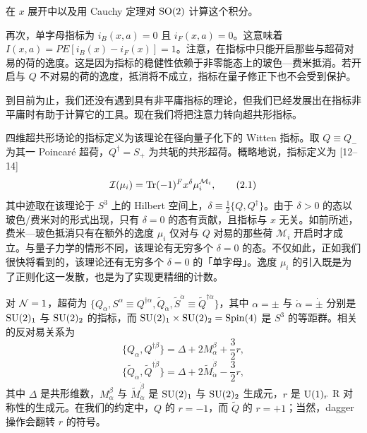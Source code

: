 \begin{exercise}[1.2]
在 $x$ 展开中以及用 Cauchy 定理对 $\operatorname{SO}(2)$ 计算这个积分。
\end{exercise}

再次，单字母指标为 $i_B(x,a)=0$ 且 $i_F(x,a)=0$。这意味着 $I(x,a)=PE[i_B(x)-i_F(x)]=1$。注意，在指标中只能开启那些与超荷对易的荷的逸度。这是因为指标的稳健性依赖于非零能态上的玻色—费米抵消。若开启与 $Q$ 不对易的荷的逸度，抵消将不成立，指标在量子修正下也不会受到保护。

到目前为止，我们还没有遇到具有非平庸指标的理论，但我们已经发展出在指标非平庸时有助于计算它的工具。现在我们将把注意力转向超共形指标。

四维超共形场论的指标定义为该理论在径向量子化下的 Witten 指标。取 $Q\equiv Q_-$ 为其一 Poincaré 超荷，$Q^\dagger=S_+$ 为共轭的共形超荷。概略地说，指标定义为 [12–14]
\[
\mathcal{I}(\mu_i)=\operatorname{Tr}(-1)^F x^{\delta}\mu_i^{\mathcal{M}_i} ,
\tag{2.1}
\]
其中迹取在该理论于 $S^3$ 上的 Hilbert 空间上，$\delta\equiv\frac12\{Q,Q^\dagger\}$。由于 $\delta>0$ 的态以玻色/费米对的形式出现，只有 $\delta=0$ 的态有贡献，且指标与 $x$ 无关。如前所述，费米—玻色抵消只有在额外的逸度 $\mu_i$ 仅对与 $Q$ 对易的那些荷 $\mathcal{M}_i$ 开启时才成立。与量子力学的情形不同，该理论有无穷多个 $\delta=0$ 的态。不仅如此，正如我们很快将看到的，该理论还有无穷多个 $\delta=0$ 的「单字母」。逸度 $\mu_i$ 的引入既是为了正则化这一发散，也是为了实现更精细的计数。

对 $\mathcal{N}=1$，超荷为 $\{Q_\alpha, S^\alpha\equiv Q^{\dagger\alpha}, \tilde Q_{\dot\alpha}, \tilde S^{\dot\alpha}\equiv \tilde Q^{\dagger\dot\alpha}\}$，其中 $\alpha=\pm$ 与 $\dot\alpha=\dot\pm$ 分别是 $\operatorname{SU}(2)_1$ 与 $\operatorname{SU}(2)_2$ 的指标，而 $\operatorname{SU}(2)_1\times \operatorname{SU}(2)_2=\mathrm{Spin}(4)$ 是 $S^3$ 的等距群。相关的反对易关系为
\[
\{Q_\alpha, Q^{\dagger\beta}\}=\Delta+2M_\alpha^\beta+\frac32 r ,
\tag{2.2}
\]
\[
\{\tilde Q_{\dot\alpha}, \tilde Q^{\dagger\dot\beta}\}=\Delta+2\tilde M_{\dot\alpha}^{\dot\beta}-\frac32 r ,
\tag{2.3}
\]
其中 $\Delta$ 是共形维数，$M_\alpha^\beta$ 与 $\tilde M_{\dot\alpha}^{\dot\beta}$ 是 $\operatorname{SU}(2)_1$ 与 $\operatorname{SU}(2)_2$ 生成元，$r$ 是 $\operatorname{U}(1)_r$ R 对称性的生成元。在我们的约定中，$Q$ 的 $r=-1$，而 $\tilde Q$ 的 $r=+1$；当然，dagger 操作会翻转 $r$ 的符号。

